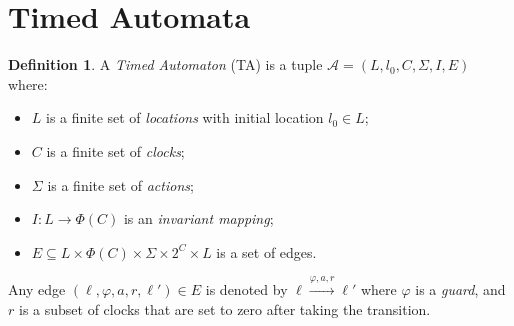 \documentclass[11pt]{article}
\theoremstyle{definition}
\newtheorem{definition}{Definition}
\theoremstyle{remark}
\begin{document}
\section{Timed Automata}\label{sec:ta}
\begin{definition}\label{def:ta}
	A \emph{Timed Automaton} (TA) is a tuple $\mathcal{A} = (L, l_0, C, \Sigma, I, E)$ where:
	\begin{itemize}
		\item $L$ is a finite set of \emph{locations} with initial location $l_0 \in L$;
		\item $C$ is a finite set of \emph{clocks};
		\item $\Sigma$ is a finite set of \emph{actions};
		\item $I \colon L \to \Phi(C)$ is an \emph{invariant mapping};
		\item $E \subseteq L \times \Phi(C) \times \Sigma \times 2^{C} \times L$ is a set of edges.
	\end{itemize}
	Any edge $(\ell, \varphi, a, r, \ell') \in E$ is denoted by $\ell \xrightarrow{\varphi, a, r} \ell'$ where $\varphi$ is a \emph{guard}, and $r$ is a subset of clocks that are set to zero after taking the transition.
\end{definition}



\end{document}
